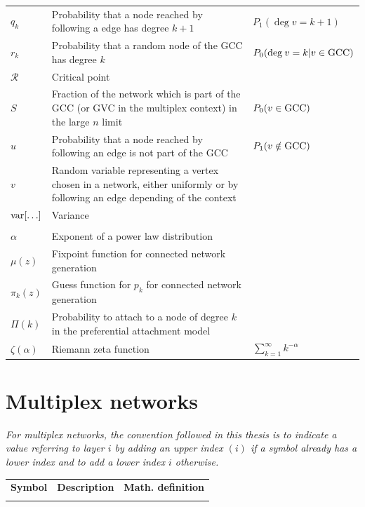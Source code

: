 \documentclass[
11pt, %
american, %
singlespacing, %
final, %
nolistspacing, %
liststotoc, %
headsepline, %
]{MastersDoctoralThesis} %
\begin{document}
{\begin{longtable}{m{}m{}m{}}
$q_k$		& Probability that a node reached by following a edge has degree $k + 1$ & $P_1(\deg{v} = k + 1)$ \\
$r_k$		& Probability that a random node of the GCC has degree $k$ & $P_0(\mathrm{deg}_{}\, v = k | v \in \mathrm{GCC})$ \\
$\mathcal{R}$ & Critical point \\
$S$ 		& Fraction of the network which is part of the GCC (or GVC in the multiplex context) in the large $n$ limit & $P_0(v \in \mathrm{GCC})$ \\
$u$			& Probability that a node reached by following an edge is not part of the GCC & $P_1(v \notin \mathrm{GCC})$ \\
$v$			& Random variable representing a vertex chosen in a network, either uniformly or by following an edge depending of the context \\
$\var{\dots}$ & Variance \\

\addlinespace \\[1.5cm]

$\alpha$	& Exponent of a power law distribution \\
$\mu(z)$	& Fixpoint function for connected network generation \\
$\pi_k(z)$		& Guess function for $p_k$ for connected network generation \\ 
$\Pi(k)$	& Probability to attach to a node of degree $k$ in the preferential attachment model \\
$\zeta(\alpha)$	& Riemann zeta function 	& $\sum_{k=1}^\infty k^{-\alpha}$ \\

\end{longtable}

\newpage

\section*{Multiplex networks}

\emph{For multiplex networks, the convention followed in this thesis is to indicate a value referring to layer $i$ by adding an upper index $(i)$ if a symbol already has a lower index and to add a lower index $i$ otherwise.}

\begin{longtable}{m{}m{}m{}}

\textbf{Symbol}	& \textbf{Description} & \textbf{Math. definition} \\
\addlinespace


\end{longtable}}
\end{document}
